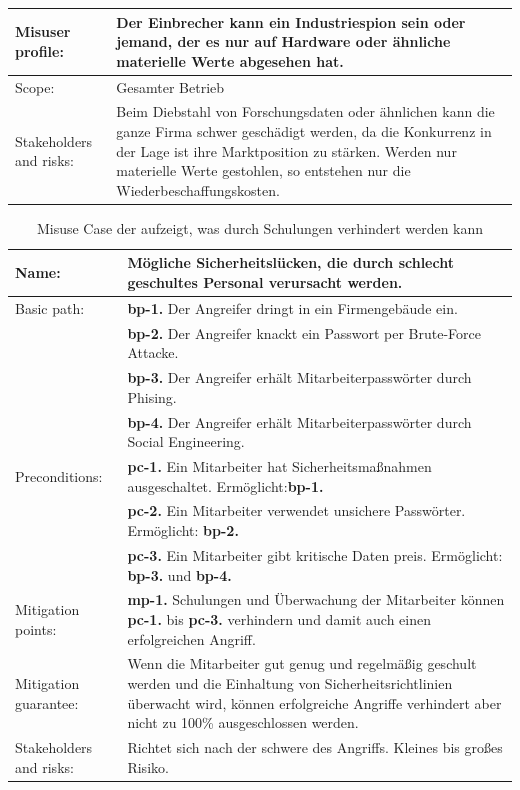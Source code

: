 \begin{table}
\begin{tabular}{p{}p{}}
\hline 
Misuser profile: & Der Einbrecher kann ein Industriespion sein oder jemand, der es nur auf Hardware oder ähnliche materielle Werte abgesehen hat. \\ 
\hline 
Scope: & Gesamter Betrieb \\
\hline 
Stakeholders and risks: &  Beim Diebstahl von Forschungsdaten oder ähnlichen kann die ganze Firma schwer geschädigt werden, da die Konkurrenz in der Lage ist ihre Marktposition zu stärken.
Werden nur materielle Werte gestohlen, so entstehen nur die Wiederbeschaffungskosten. \\ 
\hline
\end{tabular} 
\end{table}

\begin{table}
\scriptsize
\centering
\caption{Misuse Case der aufzeigt, was durch Schulungen verhindert werden kann}
\label{tab:MisuseCaseSchulung}
\begin{tabular}{p{}p{}}
\hline 
Name: & Mögliche Sicherheitslücken, die durch schlecht geschultes Personal verursacht werden. \\ 
\hline 
Basic path: & \textbf{bp-1.} Der Angreifer dringt in ein Firmengebäude ein.\\ 
& \textbf{bp-2.} Der Angreifer knackt ein Passwort per Brute-Force Attacke.\\ 
& \textbf{bp-3.} Der Angreifer erhält Mitarbeiterpasswörter durch Phising.\\ 
& \textbf{bp-4.} Der Angreifer erhält Mitarbeiterpasswörter durch Social Engineering.\\ 
\hline 
Preconditions: & \textbf{pc-1.} Ein Mitarbeiter hat Sicherheitsmaßnahmen ausgeschaltet. Ermöglicht:\textbf{bp-1.} \\
& \textbf{pc-2.} Ein Mitarbeiter verwendet unsichere Passwörter. Ermöglicht: \textbf{bp-2.}\\
& \textbf{pc-3.} Ein Mitarbeiter gibt kritische Daten preis. Ermöglicht: \textbf{bp-3.} und \textbf{bp-4.}\\
\hline 
Mitigation points: & \textbf{mp-1.} Schulungen und Überwachung der Mitarbeiter können \textbf{pc-1.} bis \textbf{pc-3.} verhindern und damit auch einen erfolgreichen Angriff.\\ 
\hline 
Mitigation guarantee: & Wenn die Mitarbeiter gut genug und regelmäßig geschult werden und die Einhaltung von Sicherheitsrichtlinien überwacht wird, können erfolgreiche Angriffe verhindert aber nicht zu 100\% ausgeschlossen werden. \\ 
\hline 
Stakeholders and risks: & Richtet sich nach der schwere des Angriffs. Kleines bis großes Risiko.  \\
\hline 
\end{tabular} 
\end{table}